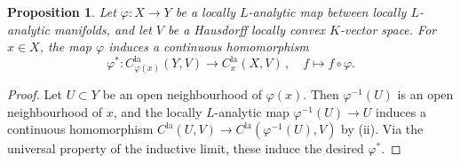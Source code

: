 \documentclass[a4paper, reqno, 10pt]{amsart}
\newtheorem{proposition}[theorem]{Proposition}
\theoremstyle{definition}
\numberwithin{equation}{section}
\newcommand{\la}{{\mathrm{la}}}
\newcommand{\lra}{\longrightarrow}
\newcommand{\lto}{\longmapsto}
\newcommand{\ra}{\rightarrow}
\begin{document}
\begin{proposition}\label{Prop 1 - Functorialities for germs of locally analytic functions}
	Let $\varphi\colon X \ra Y$ be a locally $L$-analytic map between locally $L$-analytic manifolds, and let $V$ be a Hausdorff locally convex $K$-vector space.
	For $x\in X$, the map $\varphi$ induces a continuous homomorphism
	\begin{equation*}
		\varphi^\ast \colon C^\la_{\varphi(x)}(Y,V) \lra C^\la_x(X,V) \,,\quad f \lto f \circ \varphi .
	\end{equation*}
\end{proposition}
\begin{proof}
	Let $U\subset Y$ be an open neighbourhood of $\varphi(x)$.
	Then $\varphi^{-1}(U)$ is an open neighbourhood of $x$, and the locally $L$-analytic map $\varphi^{-1}(U) \ra U$ induces a continuous homomorphism $C^\la(U,V) \ra C^\la(\varphi^{-1}(U),V)$ by  (ii).
	Via the universal property of the inductive limit, these induce the desired $\varphi^\ast$.
\end{proof}
\end{document}
